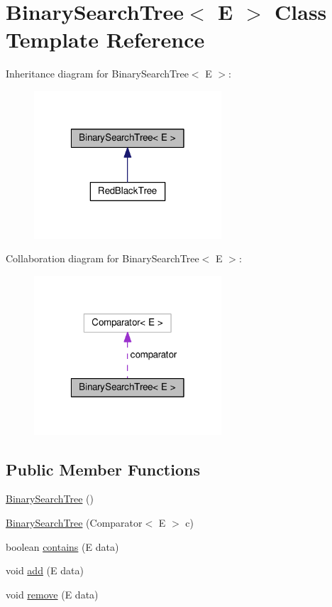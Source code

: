 \hypertarget{class_binary_search_tree}{}\section{Binary\+Search\+Tree$<$ E $>$ Class Template Reference}
\label{class_binary_search_tree}


Inheritance diagram for Binary\+Search\+Tree$<$ E $>$\+:
\nopagebreak
\begin{figure}[H]
\begin{center}
\leavevmode
\includegraphics[width=198pt]{class_binary_search_tree__inherit__graph}
\end{center}
\end{figure}


Collaboration diagram for Binary\+Search\+Tree$<$ E $>$\+:
\nopagebreak
\begin{figure}[H]
\begin{center}
\leavevmode
\includegraphics[width=198pt]{class_binary_search_tree__coll__graph}
\end{center}
\end{figure}
\subsection*{Public Member Functions}
\begin{DoxyCompactItemize}
\item 
\hyperlink{class_binary_search_tree_ab2a7466f6faa5cd8aa5b95510f1abec1}{Binary\+Search\+Tree} ()
\item 
\hyperlink{class_binary_search_tree_a207e21194b5a7f5592ec176bab05fbaa}{Binary\+Search\+Tree} (Comparator$<$ E $>$ c)
\item 
boolean \hyperlink{class_binary_search_tree_aecf969906c0201b48e8930a5e3833b36}{contains} (E data)
\item 
void \hyperlink{class_binary_search_tree_a3a559cec2b77572e287bba2eea43a2ea}{add} (E data)
\item 
void \hyperlink{class_binary_search_tree_a8e90ad601540c44c53bfdb2b1e9b464c}{remove} (E data)
\end{DoxyCompactItemize}
